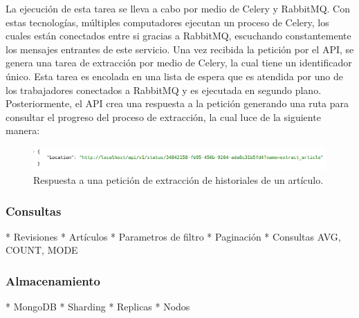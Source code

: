 La ejecución de esta tarea se lleva a cabo por medio de Celery y RabbitMQ.
Con estas tecnologías, múltiples computadores ejecutan un proceso de Celery, los
cuales están conectados entre si gracias a RabbitMQ, escuchando constantemente los mensajes entrantes de este servicio.
Una vez recibida la petición por el API, se genera una tarea de extracción por medio de Celery, la cual tiene un identificador único. Esta tarea es encolada en una lista de
espera que es atendida por uno de los trabajadores conectados a RabbitMQ y es ejecutada en segundo plano.
Posteriormente, el API crea una respuesta a la petición generando una ruta para consultar el progreso
del proceso de extracción, la cual luce de la siguiente manera:

\begin{figure}[H]
	\centering
		\includegraphics[width=1\textwidth]{figures/extract_response}
	\caption{Respuesta a una petición de extracción de historiales de un artículo.}
	\label{fig:extract_response}
\end{figure}

\subsubsection{Consultas}

* Revisiones
* Artículos
* Parametros de filtro
* Paginación
* Consultas AVG, COUNT, MODE

\subsubsection{Almacenamiento}

* MongoDB
* Sharding
* Replicas
* Nodos
